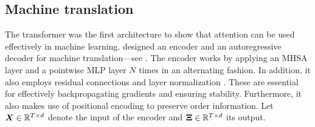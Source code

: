 \subsection{Machine translation}

The transformer \citep{vaswani2017attention} was the first architecture to show that attention can
be used effectively in machine learning. \citet{vaswani2017attention} designed an encoder and an
autoregressive decoder for machine translation---see . The encoder works
by applying an MHSA layer and a pointwise MLP layer $N$ times in an alternating fashion. In
addition, it also employs residual connections \citep{he2016deep} and layer normalization
\citep{lei2016layer}. These are essential for effectively backpropagating gradients and ensuring
stability. Furthermore, it also makes use of positional encoding to preserve order information. Let
$\bm{X} \in \mathbb{R}^{T \times d}$ denote the input of the encoder and $\bm{\Xi} \in \mathbb{R}^{T \times d}$
its output.


